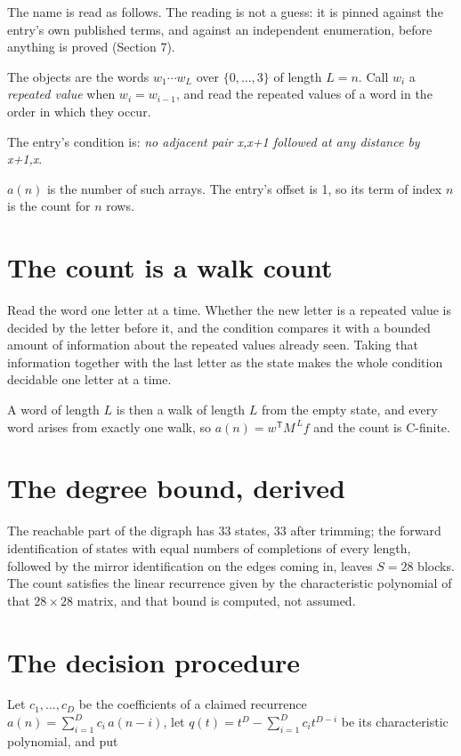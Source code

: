 \documentclass[11pt]{article}
\theoremstyle{definition}
\begin{document}
The name is read as follows. The reading is not a guess: it is pinned against the entry's own published terms, and against an independent enumeration, before anything is proved (Section 7).

The objects are the words $w_1\cdots w_L$ over $\{0,\dots,3\}$ of length $L = n$. Call $w_i$ a {\itshape repeated value} when $w_i = w_{i-1}$, and read the repeated values of a word in the order in which they occur.

The entry's condition is: {\itshape no adjacent pair x,x+1 followed at any distance by x+1,x}.

$a(n)$ is the number of such arrays. The entry's offset is 1, so its term of index $n$ is the count for $n$ rows.

\section{The count is a walk count}

Read the word one letter at a time. Whether the new letter is a repeated value is decided by the letter before it, and the condition compares it with a bounded amount of information about the repeated values already seen. Taking that information together with the last letter as the state makes the whole condition decidable one letter at a time.

A word of length $L$ is then a walk of length $L$ from the empty state, and every word arises from exactly one walk, so $a(n) = w^{\mathsf T}M^{\,L}f$ and the count is C-finite.

\section{The degree bound, derived}

The reachable part of the digraph has $33$ states, $33$ after trimming; the forward identification of states with equal numbers of completions of every length, followed by the mirror identification on the edges coming in, leaves $S = 28$ blocks. The count satisfies the linear recurrence given by the characteristic polynomial of that $28\times28$ matrix, and that bound is computed, not assumed.

\section{The decision procedure}

Let $c_1,\dots,c_D$ be the coefficients of a claimed recurrence $a(n) = \sum_{i=1}^{D} c_i\,a(n-i)$, let $q(t) = t^{D} - \sum_{i=1}^{D} c_i t^{D-i}$ be its characteristic polynomial, and put
\end{document}
